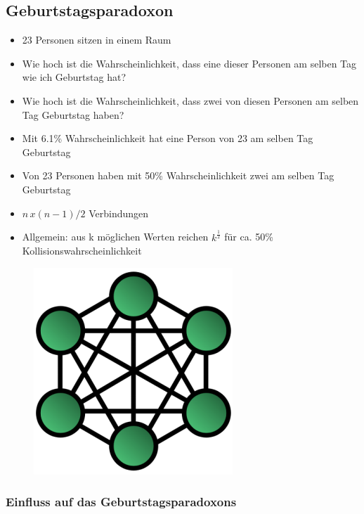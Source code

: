 \documentclass[openany]{book}
\begin{document}
\subsection{Geburtstagsparadoxon}

\begin{itemize}
    \item 23 Personen sitzen in einem Raum
    \item Wie hoch ist die Wahrscheinlichkeit, dass eine dieser Personen am selben Tag wie ich Geburtstag hat?
    \item Wie hoch ist die Wahrscheinlichkeit, dass zwei von diesen Personen am selben Tag Geburtstag haben?
\end{itemize}

\begin{itemize}
    \item Mit 6.1\% Wahrscheinlichkeit hat eine Person von 23 am selben Tag Geburtstag
    \item Von 23 Personen haben mit 50\% Wahrscheinlichkeit zwei am selben Tag Geburtstag
    \item $n\, x(n-1)/2$ Verbindungen
    \item Allgemein: aus k möglichen Werten reichen $k^\frac{1}{2}$ für ca. 50\% Kollisionswahrscheinlichkeit
\end{itemize}

\begin{figure}[h!]
    \centering
    \includegraphics[width=0.25\linewidth]{Pics/Hashing2.PNG}
\end{figure} 

\subsubsection{Einfluss auf das Geburtstagsparadoxons}
\end{document}
